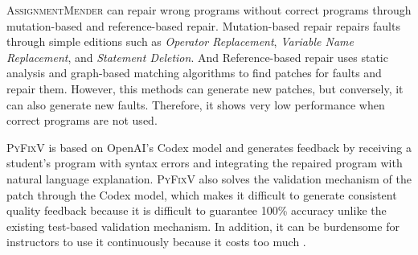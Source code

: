 \documentclass[10pt,conference]{IEEEtran}
\begin{document}
        \textsc{AssignmentMender} \cite{li2022generating} can repair wrong programs without correct programs through mutation-based and reference-based repair. Mutation-based repair repairs faults through simple editions such as \textit{Operator Replacement}, \textit{Variable Name Replacement}, and \textit{Statement Deletion}. And Reference-based repair uses static analysis and graph-based matching algorithms to find patches for faults and repair them. However, this methods can generate new patches, but conversely, it can also generate new faults. Therefore, it shows very low performance when correct programs are not used.
        
        
        \textsc{PyFixV} \cite{phung2023generating} is based on OpenAI's Codex model and generates feedback by receiving a student's program with syntax errors and integrating the repaired program with natural language explanation. \textsc{PyFixV} also solves the validation mechanism of the patch through the Codex model, which makes it difficult to generate consistent quality feedback because it is difficult to guarantee 100\% accuracy unlike the existing test-based validation mechanism. In addition, it can be burdensome for instructors to use it continuously because it costs too much \cite{joshi2023repair}.
        
\end{document}
